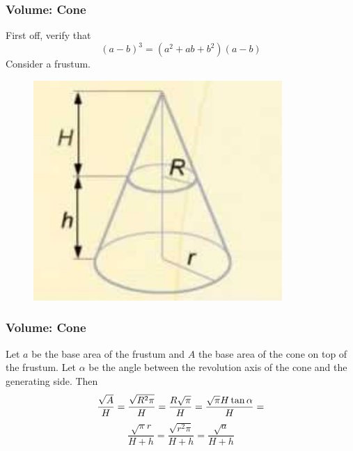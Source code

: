 \documentclass[xcolor=dvipsnames]{beamer}
\begin{document}
\begin{frame}
  \frametitle{Volume: Cone}
  First off, verify that
  \begin{equation}
    \label{eq:oeveezee}
    (a-b)^{3}=(a^{2}+ab+b^{2})(a-b)
  \end{equation}
Consider a frustum. 
  \begin{figure}[h]
    \includegraphics[scale=.5]{./frustum.png}
  \end{figure}
\end{frame}

\begin{frame}
  \frametitle{Volume: Cone}
Let $a$ be the base area of the frustum and $A$ the base area of the
cone on top of the frustum. Let $\alpha$ be the angle between the
revolution axis of the cone and the generating side. Then
\begin{equation}
  \label{eq:aroowiej}
  \frac{\sqrt{A}}{H}=\frac{\sqrt{R^{2}\pi}}{H}=\frac{R\sqrt{\pi}}{H}=\frac{\sqrt{\pi}H\tan\alpha}{H}=\notag
\end{equation}
\begin{equation}
  \label{eq:hopeexee}
  \frac{\sqrt{\pi}r}{H+h}=\frac{\sqrt{r^{2}\pi}}{H+h}=\frac{\sqrt{a}}{H+h}
\end{equation}
\end{frame}
\end{document}

